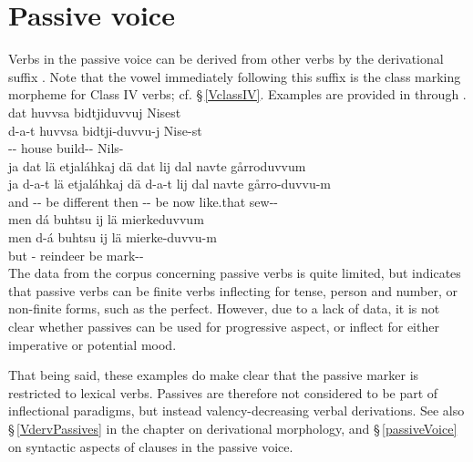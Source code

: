 \section{Passive voice}\label{passiveVinflection}
Verbs in the passive voice can be derived from other verbs by the derivational suffix . Note that the vowel immediately following this suffix is the class marking morpheme for Class IV verbs; cf. §\,\ref{VclassIV}. 
Examples are provided in  through . 
\ea\label{passEx4}%
\glll	dat huvvsa bidtjiduvvuj Nisest\\
	d-a-t huvvsa bidtji-duvvu-j Nise-st\\
	-- house\BS{} build-- Nils-\\\nopagebreak
{}	
\z
\ea\label{passEx1a}%
\glll	ja dat lä etjaláhkaj dä dat lij dal navte gårroduvvum\\
	ja d-a-t lä etjaláhkaj dä d-a-t lij dal navte gårro-duvvu-m\\
	and -- be\BS{} different then -- be\BS{} now like.that sew--\\\nopagebreak
{}	
\z
\ea\label{passEx1b}%
\glll	men dá buhtsu ij lä mierkeduvvum\\
	men d-á buhtsu ij lä mierke-duvvu-m\\
	but -\BS{} reindeer\BS{} \BS{} be\BS{} mark--\\\nopagebreak
{}	
\z
The data from the corpus concerning passive verbs is quite limited, but indicates that passive verbs can be finite verbs inflecting for tense, person and number, or non-finite forms, such as the perfect. However, due to a lack of data, it is not clear whether passives can be used for progressive aspect, or inflect for either imperative or potential mood. 

That being said, these examples do make clear that the passive marker is restricted to lexical verbs. %
Passives are therefore not considered to be part of inflectional paradigms, but instead valency-decreasing verbal derivations. See also §\,\ref{VdervPassives} in the chapter on derivational morphology, and §\,\ref{passiveVoice} on syntactic aspects of clauses in the passive voice. 

